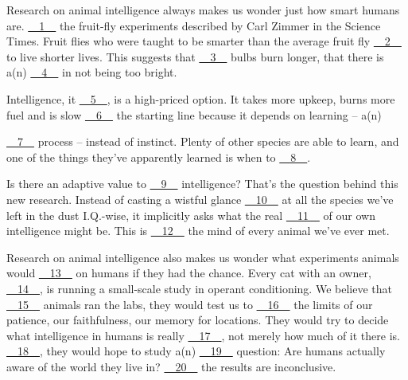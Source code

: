 Research on animal intelligence always makes us wonder just how smart humans are. \uline{~~1~~} the fruit-fly experiments described by Carl Zimmer in the  Science Times. Fruit flies who were taught to be smarter than the average fruit fly \uline{~~2~~} to live shorter lives. This suggests that \uline{~~3~~} bulbs burn longer, that  there is a(n) \uline{~~4~~} in not being too bright.


Intelligence, it \uline{~~5~~}, is a high-priced option. It takes more upkeep, burns more fuel and is slow \uline{~~6~~} the starting line because it depends on learning – a(n)


\uline{~~7~~} process – instead of instinct. Plenty of other species are able to learn, and one of the things they've apparently learned is when to \uline{~~8~~}.


Is there an adaptive value to \uline{~~9~~} intelligence? That's the question behind this new research. Instead of casting a wistful glance \uline{~~10~~} at all the species we've left in the dust I.Q.-wise, it implicitly asks what the real \uline{~~11~~} of our own intelligence might be. This is \uline{~~12~~} the mind of every animal we've ever met.


Research on animal intelligence also makes us wonder what experiments animals would \uline{~~13~~} on humans if they had the chance. Every cat with an owner, \uline{~~14~~}, is running a small-scale study in operant conditioning. We believe that \uline{~~15~~} animals ran the labs, they would test us to \uline{~~16~~} the limits of our patience, our faithfulness, our memory for locations. They would try to decide what intelligence in humans is really \uline{~~17~~}, not merely how much of it there is. \uline{~~18~~}, they would hope to   study a(n) \uline{~~19~~} question: Are humans actually aware of the world they live  in? \uline{~~20~~} the results are inconclusive.


